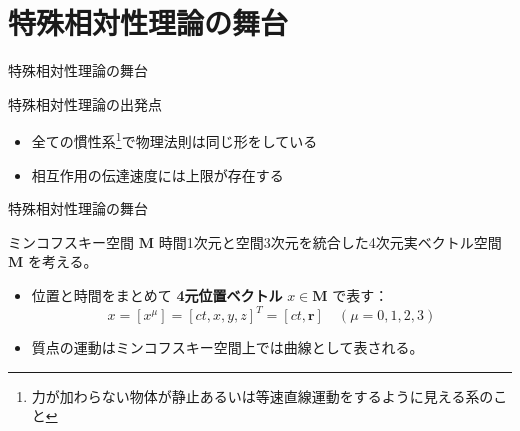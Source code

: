 \documentclass[unicode, aspectratio=169, 12pt]{beamer}
\begin{document}
\section{特殊相対性理論の舞台}


\begin{frame}{特殊相対性理論の舞台}
    \begin{block}{特殊相対性理論の出発点}
        \begin{itemize}
            \item 全ての慣性系\footnote{力が加わらない物体が静止あるいは等速直線運動をするように見える系のこと}で物理法則は同じ形をしている
            \item 相互作用の伝達速度には上限が存在する%
        \end{itemize}
    \end{block}
\end{frame}

\begin{frame}{特殊相対性理論の舞台}
    \begin{block}{ミンコフスキー空間 $\bm{M}$}
        時間1次元と空間3次元を統合した4次元実ベクトル空間 $\bm{M}$ を考える。
        \begin{itemize}
            \item 位置と時間をまとめて \textbf{4元位置ベクトル} $x \in \bm{M}$ で表す：
            \begin{equation*}
                x = [x^\mu] = [ct, x, y, z]^T=[ct,\bm{r}] \quad (\mu = 0, 1, 2, 3)
            \end{equation*}
            \item 質点の運動はミンコフスキー空間上では曲線として表される。
        \end{itemize}
    \end{block}
\end{frame}
\end{document}
